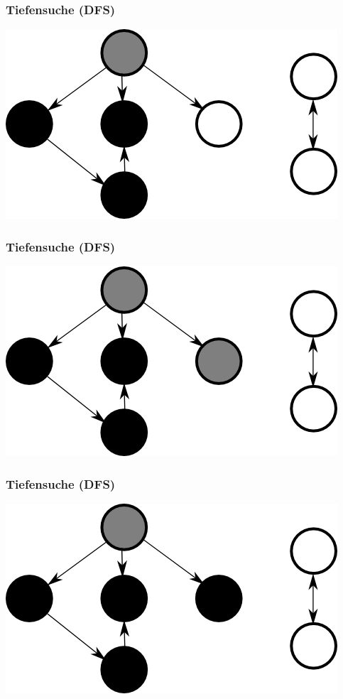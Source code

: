 \documentclass{beamer}
\begin{document}
\begin{frame}
\frametitle{Tiefensuche (DFS)}
\begin{center}
\includegraphics{dfs7}
\end{center}
\end{frame}


\begin{frame}
\frametitle{Tiefensuche (DFS)}
\begin{center}
\includegraphics{dfs8}
\end{center}
\end{frame}


\begin{frame}
\frametitle{Tiefensuche (DFS)}
\begin{center}
\includegraphics{dfs9}
\end{center}
\end{frame}
\end{document}

